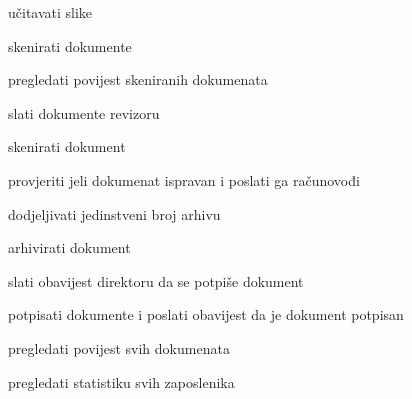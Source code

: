 			
			\begin{packed_enum}
				\item  {}
				
				\begin{packed_enum}
					
					\item učitavati slike
					\item skenirati dokumente
					\item pregledati povijest skeniranih dokumenata
					\item slati dokumente revizoru
					
				\end{packed_enum}
			
				\item  {}
				
				\begin{packed_enum}
					
					\item skenirati dokument
					\item provjeriti jeli dokumenat ispravan i poslati ga računovođi
					
				\end{packed_enum}
			
				\item  {}
				
				\begin{packed_enum}
					
					\item dodjeljivati jedinstveni broj arhivu
					\item arhivirati dokument
					\item slati obavijest direktoru da se potpiše dokument
					
				\end{packed_enum}
			
				\item  {}
				
				\begin{packed_enum}
					
					\item potpisati dokumente i poslati obavijest da je dokument potpisan
					\item pregledati povijest svih dokumenata
					\item pregledati statistiku svih zaposlenika
					
				\end{packed_enum}
				

\end{packed_enum}
